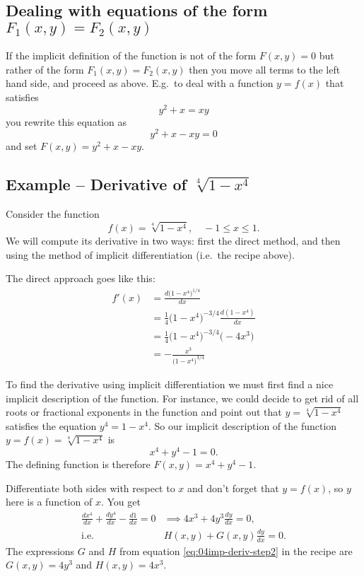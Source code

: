 \subsection{Dealing with equations of the form $F_1(x,y) = F_2(x, y)$}
If the implicit definition of the function is not of the form $F(x,y)=0$ but
rather of the form $F_1(x,y) = F_2(x, y)$ then you move all terms to the
left hand side, and proceed as above.  E.g.\ to deal with a function $y=f(x)$
that satisfies
\[
y^2+x = xy
\]
you rewrite this equation as
\[
y^2+x-xy = 0
\]
and set $F(x, y) = y^2+x-xy$.

\subsection{Example -- Derivative of $\sqrt[4]{1-x^4}$}
Consider the function
\[
f(x) = \sqrt[4]{1-x^4}, \quad -1\leq x\leq 1.
\]
We will compute its derivative in two ways: first the direct method,
and then using the method of implicit differentiation (i.e.\ the recipe
above).

The direct approach goes like this:
\begin{align*}
  f'(x) &= \frac{d\bigl(1-x^4\bigr)^{1/4}}{dx} \\
  &= \tfrac14 \bigl(1-x^4\bigr)^{-3/4}\frac{d(1-x^4)}{dx}\\
  &= \tfrac14 \bigl(1-x^4\bigr)^{-3/4}\bigl(-4x^3\bigr)\\
  &=-\frac{x^3}{\bigl(1-x^4\bigr)^{3/4}}
\end{align*}

To find the derivative using implicit differentiation we must first
find a nice implicit description of the function.  For instance, we
could decide to get rid of all roots or fractional exponents in the
function and point out that $y=\sqrt[4]{1-x^4}$ satisfies the equation
$y^4 = 1-x^4$.  So our implicit description of the function $y=f(x)=
\sqrt[4]{1-x^4}$ is
\[
x^4+y^4-1=0.
\]
The defining function is therefore $F(x,y) = x^4+y^4-1$.

Differentiate both sides with respect to $x$ and don't forget that
$y=f(x)$, so $y$ here is a function of $x$.  You get
\begin{align*}
  \frac{d x^4}{dx} + \frac{dy^4}{dx} -\frac{d1}{dx} =0
  &\implies 4x^3 + 4y^3 \frac{dy}{dx} = 0, \\
  \text{i.e. }& H(x, y) + G(x, y) \frac{dy} {dx} = 0.
\end{align*}
The expressions $G$ and $H$ from equation \eqref{eq:04imp-deriv-step2}
in the recipe are $G(x,y) = 4y^3$ and $H(x, y) = 4x^3$.

